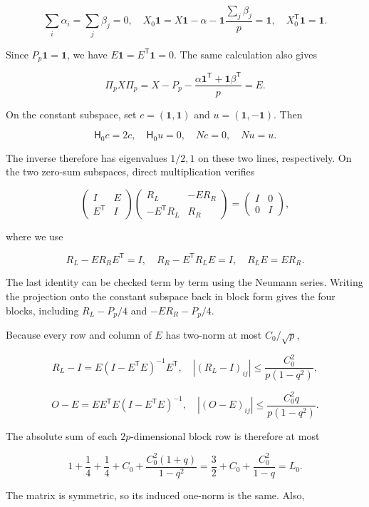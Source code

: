 \documentclass[11pt,a4paper]{article}
\begin{document}
\[
\sum_i\alpha_i=\sum_j\beta_j=0,
\quad X_0\mathbf1=X\mathbf1-\alpha-\mathbf1\frac{\sum_j\beta_j}p=\mathbf1,
\quad X_0^{\mathsf T}\mathbf1=\mathbf1.
\]

Since \(P_p\mathbf1=\mathbf1\), we have \(E\mathbf1=E^{\mathsf T}\mathbf1=0\). The same calculation also gives

\[
\Pi_pX\Pi_p=X-P_p-\frac{\alpha\mathbf1^{\mathsf T}+\mathbf1\beta^{\mathsf T}}p=E.
\]

On the constant subspace, set \(c=(\mathbf1,\mathbf1)\) and \(u=(\mathbf1,-\mathbf1)\). Then

\[
\mathsf H_0c=2c,\quad\mathsf H_0u=0,\quad Nc=0,\quad Nu=u.
\]

The inverse therefore has eigenvalues \(1/2,1\) on these two lines, respectively. On the two zero-sum subspaces, direct multiplication verifies

\[
\begin{pmatrix}I&E\\E^{\mathsf T}&I\end{pmatrix}
\begin{pmatrix}R_L&-ER_R\\-E^{\mathsf T}R_L&R_R\end{pmatrix}
=\begin{pmatrix}I&0\\0&I\end{pmatrix},
\]

where we use

\[
R_L-ER_RE^{\mathsf T}=I,\quad R_R-E^{\mathsf T}R_LE=I,
\quad R_LE=ER_R.
\]

The last identity can be checked term by term using the Neumann series. Writing the projection onto the constant subspace back in block form gives the four blocks, including \(R_L-P_p/4\) and \(-ER_R-P_p/4\).

Because every row and column of \(E\) has two-norm at most \(C_0/\sqrt p\),

\[
R_L-I=E(I-E^{\mathsf T}E)^{-1}E^{\mathsf T},
\quad |(R_L-I)_{ij}|\le\frac{C_0^2}{p(1-q^2)},
\]

\[
O-E=EE^{\mathsf T}E(I-E^{\mathsf T}E)^{-1},
\quad |(O-E)_{ij}|\le\frac{C_0^2q}{p(1-q^2)}.
\]

The absolute sum of each \(2p\)-dimensional block row is therefore at most

\[
1+\frac14+\frac14+C_0+
\frac{C_0^2(1+q)}{1-q^2}
=\frac32+C_0+\frac{C_0^2}{1-q}=L_0.
\]

The matrix is symmetric, so its induced one-norm is the same. Also,
\end{document}
